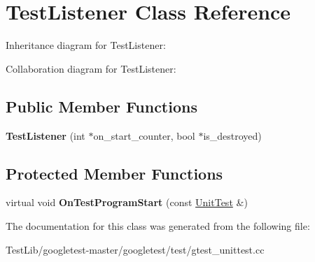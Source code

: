 \hypertarget{classTestListener}{}\section{Test\+Listener Class Reference}
\label{classTestListener}


Inheritance diagram for Test\+Listener\+:


Collaboration diagram for Test\+Listener\+:
\subsection*{Public Member Functions}
\begin{DoxyCompactItemize}
\item 
\mbox{\label{classTestListener_ab65604c6c3742c494e9378e770da5d42}} 
{\bfseries Test\+Listener} (int $\ast$on\+\_\+start\+\_\+counter, bool $\ast$is\+\_\+destroyed)
\end{DoxyCompactItemize}
\subsection*{Protected Member Functions}
\begin{DoxyCompactItemize}
\item 
\mbox{\label{classTestListener_a6218f522f5b6b37050ff0ea630ac5fd3}} 
virtual void {\bfseries On\+Test\+Program\+Start} (const \hyperlink{classtesting_1_1UnitTest}{Unit\+Test} \&)
\end{DoxyCompactItemize}


The documentation for this class was generated from the following file\+:\begin{DoxyCompactItemize}
\item 
Test\+Lib/googletest-\/master/googletest/test/gtest\+\_\+unittest.\+cc\end{DoxyCompactItemize}
